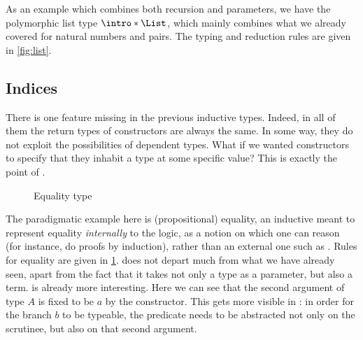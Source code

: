 \AP As an example which combines both recursion and parameters, we have the polymorphic list
type $\intro*\List$, which mainly combines what
we already covered for natural numbers and pairs. The typing and reduction rules are
given in \cref{fig:list}.


\subsection{Indices}

There is one feature missing in the previous inductive types. Indeed, in all of them
the return types of constructors are always the same. In some way, they do not exploit
the possibilities of dependent types. What if we wanted constructors
to specify that they inhabit a type at some specific value? This is exactly the point of
.

\begin{figure}
  \AP
  \caption{Equality type}
  \label{fig:eq-type}
\end{figure}

The paradigmatic example here is (propositional) equality, an
inductive meant to represent equality \emph{internally} to the logic, \ie as a notion on
which one can reason (for instance, do proofs by induction), rather than an external one
such as .
Rules for equality are given in \cref{fig:eq-type}.  does not depart
much from what we have already seen,
apart from the fact that it takes not only a type as a parameter, but
also a term.  is already more interesting. Here we can see that
the second argument of type $A$ is fixed to be $a$ by the constructor. This gets
more visible in : in order for the branch $b$
to be typeable, the predicate needs to be abstracted not only on the scrutinee,
but also on that second argument.

